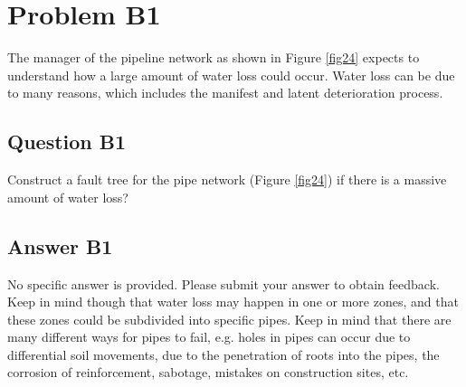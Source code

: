 \section{Problem B1 }
The manager of the pipeline network as shown in Figure \ref{fig24} expects to
understand how a large amount of water loss could occur. Water loss can be due to
many reasons, which includes the manifest and latent deterioration process.
\subsection{Question B1}
Construct a fault tree for the pipe network (Figure \ref{fig24}) if there is a
massive amount of water loss?
\subsection{Answer B1}
No specific answer is provided. Please submit your answer to obtain feedback.
Keep in mind though that water loss may happen in one or more zones, and that
these zones could be subdivided into specific pipes. Keep in mind that there are
many different ways for pipes to fail, e.g. holes in pipes can occur due to
differential soil movements, due to the penetration of roots into the pipes, the
corrosion of reinforcement, sabotage, mistakes on construction sites, etc.



% 